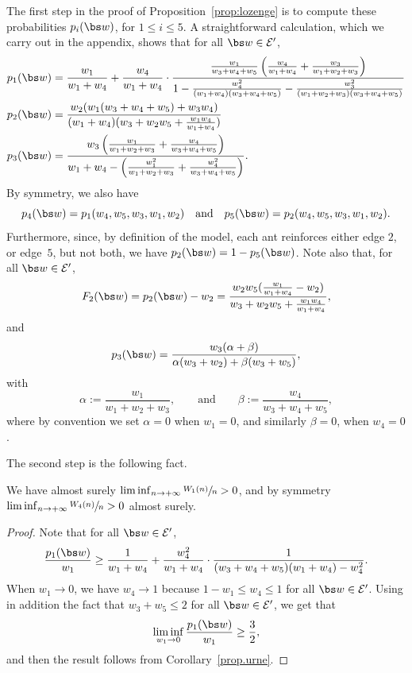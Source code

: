 The first step in the proof of Proposition~\ref{prop:lozenge} is to compute these probabilities $p_i(\bs w)$, for $1\le i \le 5$.
A straightforward calculation, which we carry out in the appendix, shows that
for all $\bs w\in \mathcal E'$,
\begin{align}
p_1(\bs w) &= \frac{w_1}{w_1+w_4} + \frac{w_4}{w_1+w_4}\cdot
\frac{\frac{w_1}{w_3+w_4+w_5}\left(\frac{w_4}{w_1+w_4}+\frac{w_3}{w_1+w_2+w_3}\right)}
{1-\frac{w_4^2}{(w_1+w_4)(w_3+w_4+w_5)}-\frac{w_3^2}{(w_1+w_2+w_3)(w_3+w_4+w_5)}}\notag\\
p_2(\bs w)&= \frac{w_2(w_1(w_3+w_4+w_5)+w_3w_4)}{(w_1+w_4)(w_3+w_2w_5+\frac{w_1w_4}{w_1+w_4})}\notag\\
p_3(\bs w) &= \frac{w_3\left(\frac{w_1}{w_1+w_2+w_3}+\frac{w_4}{w_3+w_4+w_5}\right)}
{w_1+w_4 - \left(\frac{w_1^2}{w_1+w_2+w_3}+\frac{w_4^2}{w_3+w_4+w_5}\right)}.
\label{eq:formule_lozenge}
\end{align}
By symmetry, we also have
\[
p_4(\bs w) = p_1(w_4, w_5, w_3, w_1, w_2)\quad\text{and}\quad p_5(\bs w) = p_2(w_4, w_5, w_3, w_1, w_2).
\]
Furthermore, since, by definition of the model, each ant reinforces either edge $2$, or edge~$5$, but not both, we have $p_2(\bs w) = 1-p_5(\bs w)$.
Note also that, for all $\bs w\in\mathcal E'$,
\begin{equation}\label{F2.lozenge}
F_2(\bs w)
= p_2(\bs w) - w_2
= \frac{w_2w_5 (\frac{w_1}{w_1+w_4} - w_2)}{w_3+w_2w_5+\frac{w_1w_4}{w_1+w_4}},
\end{equation}
and
\begin{equation}\label{F3.lozenge}
p_3(\bs w) = \frac{w_3(\alpha + \beta)}{\alpha(w_3+w_2) + \beta(w_3+w_5)},
\end{equation}
with
\begin{equation}\label{alpha.beta}
{\alpha}:= \frac{w_1}{w_1+w_2+w_3}, \qquad \text{and}\qquad {\beta} := \frac{w_4}{w_3+w_4+w_5},
\end{equation}
where by convention we set ${\alpha} = 0$ when $w_1=0$, and similarly ${\beta}=0$, when $w_4=0$.

The second step is the following fact.
\begin{lemma}\label{lem:liminf_lozenge}
We have almost surely $\liminf_{n\to +\infty} \sfrac{W_1(n)}{n}>0$, and by symmetry $\liminf_{n\to +\infty} \sfrac{W_4(n)}{n}>0$ {almost surely}.
\end{lemma}
\begin{proof}
Note that for all $\bs w\in \mathcal E'$,
\[
\frac{p_1(\bs w)}{w_1} \ge \frac{1}{w_1+w_4} + \frac{w_4^2}{w_1+w_4} \cdot
\frac{1}{(w_3+w_4+w_5)(w_1+w_4) -w_4^2 }.
\]
When $w_1\to 0$, we have $w_4\to 1$ because $1-w_1\le w_4\le 1$ for all $\bs w\in \mathcal E'$.
Using in addition the fact that $w_3 + w_5\le 2$ for all $\bs w\in \mathcal E'$, we get that
\[
\liminf_{w_1\to 0} \frac{p_1(\bs w)}{w_1} \ge \frac 32,
\]
and then the result follows from Corollary~\ref{prop.urne}.
\end{proof}

